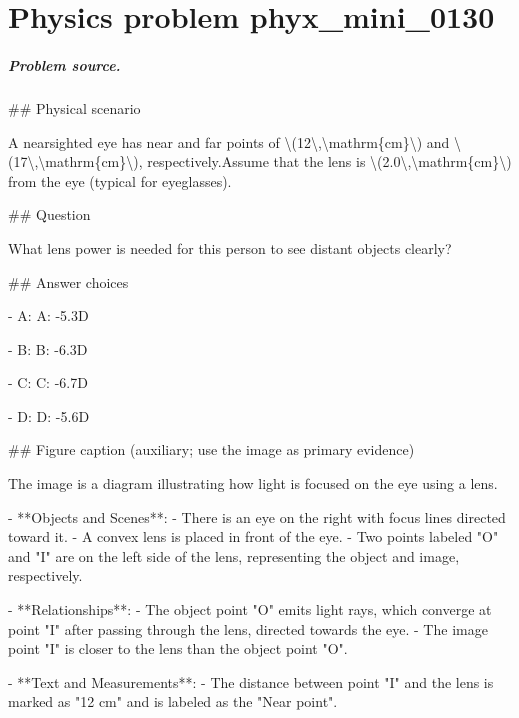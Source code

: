 
\chapter{Physics problem phyx\_mini\_0130}
\label{ch:PhyXMiniProblems_problem_phyx_mini_0130}

\paragraph{Problem source.}
\#\# Physical scenario

A nearsighted eye has near and far points of \textbackslash{}(12\textbackslash{},\textbackslash{}mathrm\{cm\}\textbackslash{}) and \textbackslash{}(17\textbackslash{},\textbackslash{}mathrm\{cm\}\textbackslash{}), respectively.Assume that the lens is \textbackslash{}(2.0\textbackslash{},\textbackslash{}mathrm\{cm\}\textbackslash{}) from the eye (typical for eyeglasses).

\#\# Question

What lens power is needed for this person to see distant objects clearly?

\#\# Answer choices

- A: A: -5.3D

- B: B: -6.3D

- C: C: -6.7D

- D: D: -5.6D

\#\# Figure caption (auxiliary; use the image as primary evidence)

The image is a diagram illustrating how light is focused on the eye using a lens. 

- **Objects and Scenes**: 
  - There is an eye on the right with focus lines directed toward it.
  - A convex lens is placed in front of the eye.
  - Two points labeled "O" and "I" are on the left side of the lens, representing the object and image, respectively.

- **Relationships**:
  - The object point "O" emits light rays, which converge at point "I" after passing through the lens, directed towards the eye.
  - The image point "I" is closer to the lens than the object point "O".

- **Text and Measurements**:
  - The distance between point "I" and the lens is marked as "12 cm" and is labeled as the "Near point".

